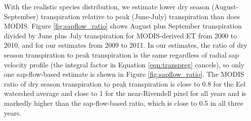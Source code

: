 With the realistic species distribution, we estimate lower dry season (August-September) transpiration relative to peak (June-July) transpiration than does MODIS.  Figure \ref{fig:sapflow_ratio} shows August plus September transpiration divided by June plus July transpiration for MODIS-derived ET from 2000 to 2010, and for our estimates from 2009 to 2011.  In our estimates, the ratio of dry season transpiration to peak transpiration is the same regardless of radial sap velocity profile (the integral factor in Equation \ref{eqn:transpreg} cancels), so only one sap-flow-based estimate is shown in Figure \ref{fig:sapflow_ratio}.  The MODIS ratio of dry season transpiration to peak transpiration is close to 0.8 for the Eel watershed average and close to 1 for the near-Rivendell pixel for all years and is markedly higher than the sap-flow-based ratio, which is close to 0.5 in all three years.



